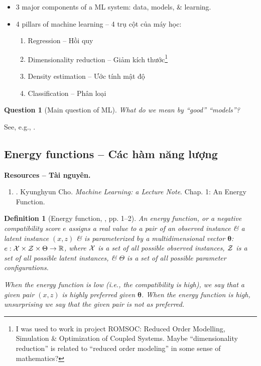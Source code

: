 \documentclass{article}
\newtheorem{definition}{Definition}
\newtheorem{question}{Question}
\begin{document}
\begin{itemize}
	\item 3 major components of a ML system: data, models, \& learning.
	\item 4 pillars of machine learning -- 4 trụ cột của máy học:
	\begin{enumerate}
		\item Regression -- Hồi quy
		\item Dimensionality reduction -- Giảm kích thước\footnote{I was used to work in project ROMSOC: Reduced Order Modelling, Simulation \& Optimization of Coupled Systems. Maybe ``dimensionality reduction'' is related to ``reduced order modeling'' in some sense of mathematics?}
		\item Density estimation -- Ước tính mật độ
		\item Classification -- Phân loại
	\end{enumerate}
\end{itemize}

\begin{question}[Main question of ML]
	What do we mean by ``good'' ``models''?
\end{question}
See, e.g., \cite[Chap. 8, Sect. 8.1: Data, Models, \& Learning]{Deisenroth_Faisal_Ong2024}.


\subsection{Energy functions -- Các hàm năng lượng}
\textbf{\textsf{Resources -- Tài nguyên.}}
\begin{enumerate}
	\item \cite{Cho_ML_lecture}. {\sc Kyunghyun Cho}. {\it Machine Learning: a Lecture Note}. Chap. 1: An Energy Function.
\end{enumerate}

\begin{definition}[Energy function, \cite{Cho_ML_lecture}, pp. 1--2]
	An {\rm energy function}, or a {\rm negative compatibility score} $e$ assigns a real value to a pair of an observed instance \& a latent instance $(x,z)$ \& is parameterized by a multidimensional vector $\boldsymbol{\theta}$: $e:{\cal X}\times{\cal Z}\times\Theta\to\mathbb{R}$, where ${\cal X}$ is a set of all possible observed instances, ${\cal Z}$ is a set of all possible latent instances, \& $\Theta$ is a set of all possible parameter configurations.
	
	When the energy function is low (i.e., the compatibility is high), we say that a given pair $(x,z)$ is {\rm highly preferred} given $\boldsymbol{\theta}$. When the energy function is high, unsurprising we say that the given pair is {\rm not as preferred}.
\end{definition}
\end{document}
